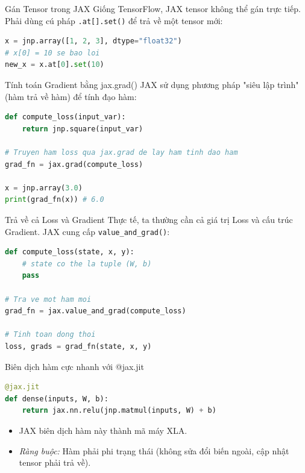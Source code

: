 \documentclass[aspectratio=169]{beamer}
\begin{document}
\begin{frame}[fragile]{Gán Tensor trong JAX}
    Giống TensorFlow, JAX tensor không thể gán trực tiếp. Phải dùng cú pháp \texttt{.at[].set()} để trả về một tensor mới:
    \begin{lstlisting}[language=Python]
x = jnp.array([1, 2, 3], dtype="float32")
# x[0] = 10 se bao loi
new_x = x.at[0].set(10)
    \end{lstlisting}
\end{frame}

\begin{frame}[fragile]{Tính toán Gradient bằng jax.grad()}
    JAX sử dụng phương pháp "siêu lập trình" (hàm trả về hàm) để tính đạo hàm:
    \begin{lstlisting}[language=Python]
def compute_loss(input_var):
    return jnp.square(input_var)

# Truyen ham loss qua jax.grad de lay ham tinh dao ham
grad_fn = jax.grad(compute_loss)

x = jnp.array(3.0)
print(grad_fn(x)) # 6.0
    \end{lstlisting}
\end{frame}

\begin{frame}[fragile]{Trả về cả Loss và Gradient}
    Thực tế, ta thường cần cả giá trị Loss và cấu trúc Gradient. JAX cung cấp \texttt{value\_and\_grad()}:
    \begin{lstlisting}[language=Python]
def compute_loss(state, x, y):
    # state co the la tuple (W, b)
    pass
    
# Tra ve mot ham moi
grad_fn = jax.value_and_grad(compute_loss)

# Tinh toan dong thoi
loss, grads = grad_fn(state, x, y)
    \end{lstlisting}
\end{frame}

\begin{frame}[fragile]{Biên dịch hàm cực nhanh với @jax.jit}
    \begin{lstlisting}[language=Python]
@jax.jit
def dense(inputs, W, b):
    return jax.nn.relu(jnp.matmul(inputs, W) + b)
    \end{lstlisting}
    \begin{itemize}
        \item JAX biên dịch hàm này thành mã máy XLA.
        \item \textit{Ràng buộc:} Hàm phải phi trạng thái (không sửa đổi biến ngoài, cập nhật tensor phải trả về).
    \end{itemize}
\end{frame}
\end{document}
